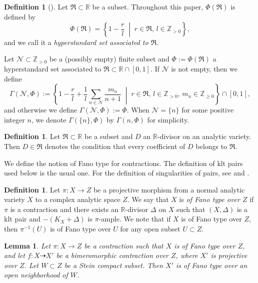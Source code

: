 \documentclass[12pt]{amsart}
\newtheorem{lem}[thm]{Lemma}
\theoremstyle{definition}
\newtheorem{defn}[thm]{Definition}
\begin{document}
\begin{defn}[{\cite[Definition 2.2]{chhx-compl}}]\label{defn--hyperstandardset}
Let $\mathfrak{R}\subset \mathbb{R}$ be a subset. 
Throughout this paper, $\Phi(\mathfrak{R})$ is defined by
$$\Phi(\mathfrak{R})=\left\{1-\frac{r}{l}\;\middle| \;r\in \mathfrak{R}, \, l\in \mathbb{Z}_{>0}\right\},$$
and we call it a {\em hyperstandard set associated to $\mathfrak{R}$}. 

Let $\mathcal{N} \subset \mathbb{Z}_{>0}$ be a (possibly empty) finite subset and $\Phi:=\Phi(\mathfrak{R})$ a hyperstandard set associated to $\mathfrak{R} \subset \mathbb{R}\cap[0,1]$. 
If $\mathcal{N}$ is not empty, then we define
$$\Gamma(\mathcal{N}, \Phi):=\left\{1-\frac{r}{l}+\frac{1}{l}\sum_{n \in \mathcal{N}}\frac{m_{n}}{n+1}\;\middle| \;r\in \mathfrak{R}, \, l\in \mathbb{Z}_{>0}, \, m_{n} \in \mathbb{Z}_{\geq 0} \right\}\cap[0,1],$$
and otherwise we define $\Gamma(\mathcal{N}, \Phi):=\Phi$. 
When $\mathcal{N}=\{n\}$ for some positive integer $n$, we denote $\Gamma(\{n\}, \Phi)$ by $\Gamma(n, \Phi)$ for simplicity. 
\end{defn}

\begin{defn}
Let $\mathfrak{R} \subset \mathbb{R}$ be a subset and $D$ an $\mathbb{R}$-divisor on an analytic variety. 
Then $D \in \mathfrak{R}$ denotes the condition that every coefficient of $D$ belongs to $\mathfrak{R}$. 
\end{defn}

We define the notion of Fano type for contractions. 
The definition of klt pairs used below is the usual one. 
For the definition of singularities of pairs, see \cite{fujino-analytic-bchm} and  \cite{eh-analytic-mmp}.  

\begin{defn}\label{defn--Fano-type}
Let $\pi \colon X \to Z$ be a projective morphism from a normal analytic variety $X$ to a complex analytic space $Z$. 
We say that $X$ is {\em of Fano type over $Z$} if $\pi$ is a contraction and there exists an $\mathbb{R}$-divisor $\Delta$ on $X$ such that $(X,\Delta)$ is a klt pair and $-(K_{X}+\Delta)$ is $\pi$-ample. 
We note that if $X$ is of Fano type over $Z$, then $\pi^{-1}(U)$ is of Fano type over $U$ for any open subset $U \subset Z$. 
\end{defn}



\begin{lem}\label{lem--Fano-type-bimero-cont}
Let $\pi \colon X \to Z$ be a contraction such that $X$ is of Fano type over $Z$, and let $f\colon X \dashrightarrow X'$ be a  bimeromorphic contraction over $Z$, where $X'$ is projective over $Z$. 
Let $W \subset Z$ be a Stein compact subset. 
Then $X'$ is of Fano type over an open neighborhood of $W$.
\end{lem}
\end{document}
